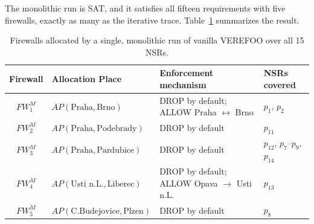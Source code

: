 The monolithic run is SAT, and it satisfies all fifteen requirements with five firewalls, exactly as many as the iterative trace. Table~\ref{tab:cesnet-monolithic} summarizes the result.

\begin{table}[H]
\centering
\caption{Firewalls allocated by a single, monolithic run of vanilla VEREFOO over all 15 NSRs.}
\label{tab:cesnet-monolithic}
\begin{tabularx}{\textwidth}{@{}cl X >{\raggedright\arraybackslash}p{2.2cm}@{}}
\hline
\textbf{Firewall} & \textbf{Allocation Place} & \textbf{Enforcement mechanism} & \textbf{NSRs covered} \\
\hline
$\mathit{FW}^{M}_1$ & $\mathit{AP}(\text{Praha},\text{Brno})$      & DROP by default; ALLOW Praha $\leftrightarrow$ Brno & $p_1$, $p_2$ \\
$\mathit{FW}^{M}_2$ & $\mathit{AP}(\text{Praha},\text{Podebrady})$ & DROP by default& $p_{11}$ \\
$\mathit{FW}^{M}_3$ & $\mathit{AP}(\text{Praha},\text{Pardubice})$ & DROP by default& $p_{12}$, $p_7$--$p_9$, $p_{14}$ \\
$\mathit{FW}^{M}_4$ & $\mathit{AP}(\text{Usti n.L.},\text{Liberec})$ & DROP by default; ALLOW Opava $\to$ Usti n.L.  & $p_{13}$ \\
$\mathit{FW}^{M}_5$ & $\mathit{AP}(\text{C.Budejovice},\text{Plzen})$ & DROP by default& $p_8$ \\
\hline
\end{tabularx}
\end{table}

